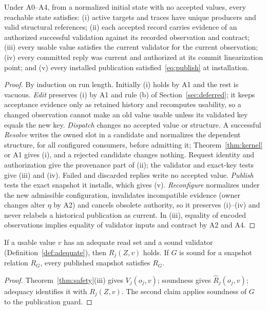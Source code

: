 \begin{theorem}\label{thm:safety}
Under A0--A4, from a normalized initial state with no accepted values, every reachable state satisfies:
(i) active targets and traces have unique producers and valid structural references;
(ii) each accepted record carries evidence of an authorized successful validation against its recorded observation and contract;
(iii) every usable value satisfies the current validator for the current observation;
(iv) every committed reply was current and authorized at its commit linearization point; and
(v) every installed publication satisfied~\eqref{eq:publish} at installation.
\end{theorem}
\begin{proof}
By induction on run length. Initially (i) holds by A1 and the rest is vacuous. \emph{Edit} preserves (i) by A1 and rule (b) of Section~\ref{sec:deferred}; it keeps acceptance evidence only as retained history and recomputes usability, so a changed observation cannot make an old value usable unless its validated key equals the new key. \emph{Dispatch} changes no accepted value or structure. A successful \emph{Resolve} writes the owned slot in a candidate and normalizes the dependent structure, for all configured consumers, before admitting it; Theorem~\ref{thm:kernel} or A1 gives (i), and a rejected candidate changes nothing. Request identity and authorization give the provenance part of (ii); the validator and exact-key tests give (iii) and (iv). Failed and discarded replies write no accepted value. \emph{Publish} tests the exact snapshot it installs, which gives (v). \emph{Reconfigure} normalizes under the new admissible configuration, invalidates incompatible evidence (owner changes alter $\eta$ by A2) and cancels obsolete authority, so it preserves (i)--(iv) and never relabels a historical publication as current. In (iii), equality of encoded observations implies equality of validator inputs and contract by A2 and A4.
\end{proof}

\begin{corollary}\label{cor:domain}
If a usable value $v$ has an adequate read set and a sound validator (Definition~\ref{def:adequate}), then $R_j(Z,v)$ holds. If $G$ is sound for a snapshot relation $R_G$, every published snapshot satisfies $R_G$.
\end{corollary}
\begin{proof}
Theorem~\ref{thm:safety}(iii) gives $V_j(o_j,v)$; soundness gives $\widehat R_j(o_j,v)$; adequacy identifies it with $R_j(Z,v)$. The second claim applies soundness of $G$ to the publication guard.
\end{proof}

